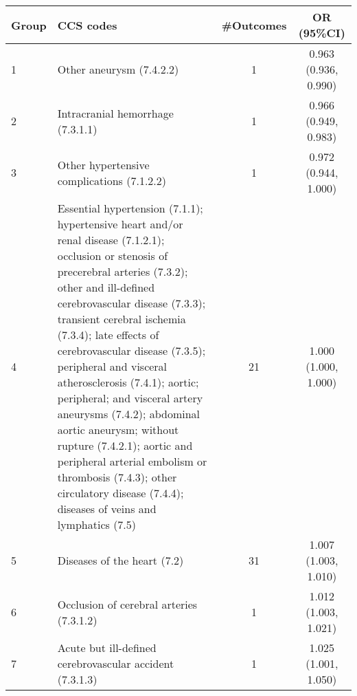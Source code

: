 \begin{tabular}{lp{8cm}cc}
  \hline
Group & CCS codes & \#Outcomes & OR (95\%CI) \\ 
  \hline
   1 & Other aneurysm (7.4.2.2) &    1 & 0.963 (0.936, 0.990) \\ 
     2 & Intracranial hemorrhage (7.3.1.1) &    1 & 0.966 (0.949, 0.983) \\ 
     3 & Other hypertensive complications (7.1.2.2) &    1 & 0.972 (0.944, 1.000) \\ 
     4 & Essential hypertension (7.1.1); hypertensive heart and/or renal disease (7.1.2.1); occlusion or stenosis of precerebral arteries (7.3.2); other and ill-defined cerebrovascular disease (7.3.3); transient cerebral ischemia (7.3.4); late effects of cerebrovascular disease (7.3.5); peripheral and visceral atherosclerosis (7.4.1); aortic; peripheral; and visceral artery aneurysms (7.4.2); abdominal aortic aneurysm; without rupture (7.4.2.1); aortic and peripheral arterial embolism or thrombosis (7.4.3); other circulatory disease (7.4.4); diseases of veins and lymphatics (7.5) &   21 & 1.000 (1.000, 1.000) \\ 
     5 & Diseases of the heart (7.2) &   31 & 1.007 (1.003, 1.010) \\ 
     6 & Occlusion of cerebral arteries (7.3.1.2) &    1 & 1.012 (1.003, 1.021) \\ 
     7 & Acute but ill-defined cerebrovascular accident (7.3.1.3) &    1 & 1.025 (1.001, 1.050) \\ 
   \hline
\end{tabular}

